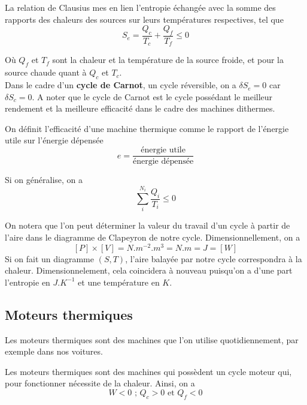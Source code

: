 \begin{theorem}
La relation de Clausius mes en lien l'entropie échangée avec la somme des rapports des chaleurs des sources sur leurs températures respectives, tel que
\begin{equation}
S_e = \frac{Q_c}{T_c} + \frac{Q_f}{T_f} \leq 0 %
\end{equation}
\end{theorem}

Où $Q_f$ et $T_f$ sont la chaleur et la température de la source froide, et pour la source chaude quant à $Q_c$ et $T_c$.\\

Dans le cadre d'un \textbf{cycle de Carnot}, un cycle réversible, on a $\delta S_e=0$ car $\delta S_c=0$. A noter que le cycle de Carnot est le cycle possédant le meilleur rendement et la meilleure efficacité dans le cadre des machines dithermes.\\

\begin{definition}[Efficacité]
On définit l'efficacité d'une machine thermique comme le rapport de l'énergie utile sur l'énergie dépensée
\begin{equation}
e=\frac{\textrm{énergie utile}}{\textrm {énergie dépensée}}
\end{equation}
\end{definition}

Si on généralise, on a
\begin{equation}
\sum \limits _i^{N_i} \frac{Q_i}{T_i} \leq 0
\end{equation}

On notera que l'on peut déterminer la valeur du travail d'un cycle à partir de l'aire dans le diagramme de Clapeyron de notre cycle. Dimensionnellement, on a 
$$[P]\times [V]=N.m^{-2}.m^3=N.m=J=[W]$$
Si on fait un diagramme $(S,T)$, l'aire balayée par notre cycle correspondra à la chaleur. Dimensionnelement, cela coincidera à nouveau puisqu'on a d'une part l'entropie en $J.K^{-1}$ et une température en $K$.

\subsection{Moteurs thermiques}

Les moteurs thermiques sont des machines que l'on utilise quotidiennement, par exemple dans nos voitures.

\begin{definition}

Les moteurs thermiques sont des machines qui possèdent un cycle moteur qui, pour fonctionner nécessite de la chaleur. Ainsi, on a 
$$W < 0\textrm{ ; } Q_c > 0 \textrm{ et } Q_f<0$$

\end{definition}

